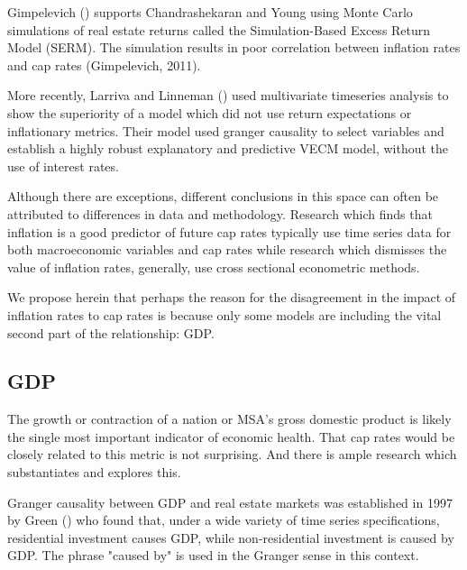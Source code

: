 Gimpelevich (\citeyear{Gimpelevich2011}) supports Chandrashekaran and Young using Monte Carlo simulations of real estate returns called the Simulation-Based Excess Return Model (SERM). The simulation results in poor correlation between inflation rates and cap rates (Gimpelevich, 2011).

More recently, Larriva and Linneman (\citeyear{larriva2021determinants}) used multivariate timeseries analysis to show the superiority of a model which did not use return expectations or inflationary metrics. Their model used granger causality to select variables and establish a highly robust explanatory and predictive VECM model, without the use of interest rates.

Although there are exceptions, different conclusions in this space can often be attributed to differences in data and methodology. Research which finds that inflation is a good predictor of future cap rates typically use time series data for both macroeconomic variables and cap rates while research which dismisses the value of inflation rates, generally, use cross sectional econometric methods.

We propose herein that perhaps the reason for the disagreement in the impact of inflation rates to cap rates is because only some models are including the vital second part of the relationship: GDP.


\subsection{GDP}

The growth or contraction of a nation or MSA's gross domestic product is likely the single most important indicator of economic health. That cap rates would be closely related to this metric is not surprising. And there is ample research which substantiates and explores this.

Granger causality between GDP and real estate markets was established in 1997 by Green (\citeyear{green1997follow}) who found that, under a wide variety of time series specifications, residential investment causes GDP, while non-residential investment is caused by GDP. The phrase "caused by" is used in the Granger sense in this context. 

